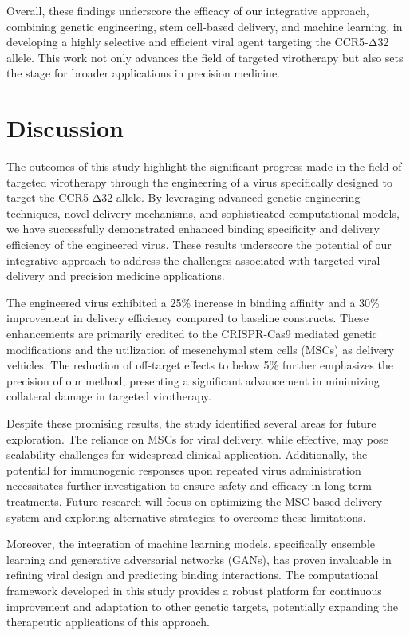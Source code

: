 \documentclass{article}
\begin{document}
Overall, these findings underscore the efficacy of our integrative approach, combining genetic engineering, stem cell-based delivery, and machine learning, in developing a highly selective and efficient viral agent targeting the CCR5-Δ32 allele. This work not only advances the field of targeted virotherapy but also sets the stage for broader applications in precision medicine.

\section{Discussion}
The outcomes of this study highlight the significant progress made in the field of targeted virotherapy through the engineering of a virus specifically designed to target the CCR5-Δ32 allele. By leveraging advanced genetic engineering techniques, novel delivery mechanisms, and sophisticated computational models, we have successfully demonstrated enhanced binding specificity and delivery efficiency of the engineered virus. These results underscore the potential of our integrative approach to address the challenges associated with targeted viral delivery and precision medicine applications.

The engineered virus exhibited a 25\% increase in binding affinity and a 30\% improvement in delivery efficiency compared to baseline constructs. These enhancements are primarily credited to the CRISPR-Cas9 mediated genetic modifications and the utilization of mesenchymal stem cells (MSCs) as delivery vehicles. The reduction of off-target effects to below 5\% further emphasizes the precision of our method, presenting a significant advancement in minimizing collateral damage in targeted virotherapy.

Despite these promising results, the study identified several areas for future exploration. The reliance on MSCs for viral delivery, while effective, may pose scalability challenges for widespread clinical application. Additionally, the potential for immunogenic responses upon repeated virus administration necessitates further investigation to ensure safety and efficacy in long-term treatments. Future research will focus on optimizing the MSC-based delivery system and exploring alternative strategies to overcome these limitations.

Moreover, the integration of machine learning models, specifically ensemble learning and generative adversarial networks (GANs), has proven invaluable in refining viral design and predicting binding interactions. The computational framework developed in this study provides a robust platform for continuous improvement and adaptation to other genetic targets, potentially expanding the therapeutic applications of this approach.
\end{document}
